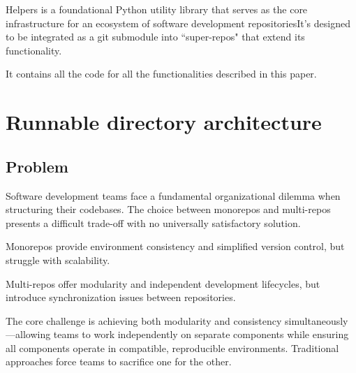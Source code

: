 Helpers is a foundational Python utility library that serves as the core
infrastructure for an ecosystem of software development repositoriesIt's
designed to be integrated as a git submodule into ``super-repos" that extend
its functionality.

It contains all the code for all the functionalities described in this
paper.

\section{Runnable directory architecture}



\subsection{Problem}

Software development teams face a fundamental organizational dilemma when
structuring their codebases. The choice between monorepos and multi-repos
presents a difficult trade-off with no universally satisfactory solution.

Monorepos provide environment consistency and simplified version control,
but struggle with scalability.

Multi-repos offer modularity and independent development lifecycles, but
introduce synchronization issues between repositories.

The core challenge is achieving both modularity and consistency
simultaneously---allowing teams to work independently on separate components
while ensuring all components operate in compatible, reproducible environments.
Traditional approaches force teams to sacrifice one for the other.

